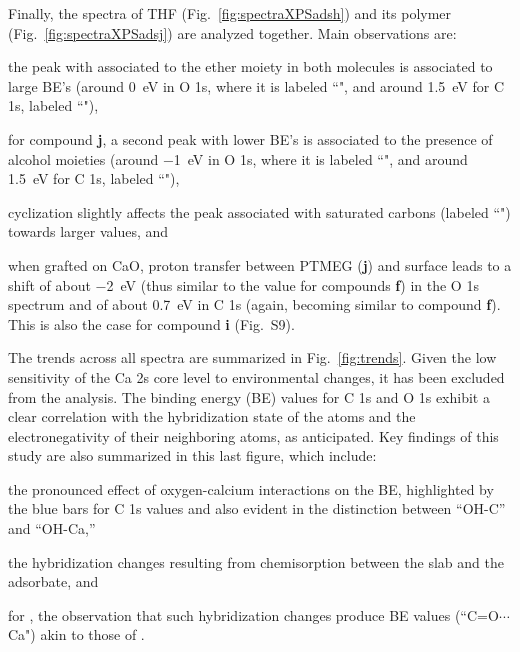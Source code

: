 \documentclass[%
aip,
amsmath,amssymb,
preprint,%
jcp,
showkeys,
]{revtex4-2}
\begin{document}

\clearpage

Finally, the spectra of THF (Fig.~\ref{fig:spectraXPSadsh}) and its polymer (Fig.~\ref{fig:spectraXPSadsj}) are analyzed together. Main observations are: \begin{inparaenum}[(i)]
	\item the peak with associated to the ether moiety in both molecules is associated to large BE's (around \SI{0}{\electronvolt} in O 1s, where it is labeled ``", and around \SI{1.5}{\electronvolt} for C 1s, labeled ``"), 
	\item for compound \textbf{j}, a second peak with lower BE's is associated to the presence of alcohol moieties (around \SI{-1}{\electronvolt} in O 1s, where it is labeled ``", and around \SI{1.5}{\electronvolt} for C 1s, labeled ``"), 
	\item cyclization slightly affects the peak associated with saturated carbons (labeled ``") towards larger values, and
	\item when grafted on CaO, proton transfer between PTMEG (\textbf{j}) and surface leads to a shift of about \SI{-2}{\electronvolt}  (thus similar to the value for compounds \textbf{f}) in the O 1s spectrum and of about \SI{0.7}{\electronvolt} in C 1s (again, becoming similar to compound \textbf{f}). This is also the case for compound \textbf{i} (Fig.~S9).
\end{inparaenum}


\clearpage

The trends across all spectra are summarized in Fig.~\ref{fig:trends}. Given the low sensitivity of the Ca 2s core level to environmental changes, it has been excluded from the analysis. The binding energy (BE) values for C 1s and O 1s exhibit a clear correlation with the hybridization state of the atoms and the electronegativity of their neighboring atoms, as anticipated.\cite{stevieIntroductionXrayPhotoelectron2020} 
Key findings of this study are also summarized in this last figure, which include: 
\begin{inparaenum}[(i)]
	\item the pronounced effect of oxygen-calcium interactions on the BE, highlighted by the blue bars for C 1s values and also evident in the distinction between ``OH-C'' and ``OH-Ca,'' 
	\item the hybridization changes resulting from chemisorption between the slab and the adsorbate, and 
	\item for , the observation that such hybridization changes produce BE values (``C=O$\cdots$Ca") akin to those of .
\end{inparaenum}
\end{document}
